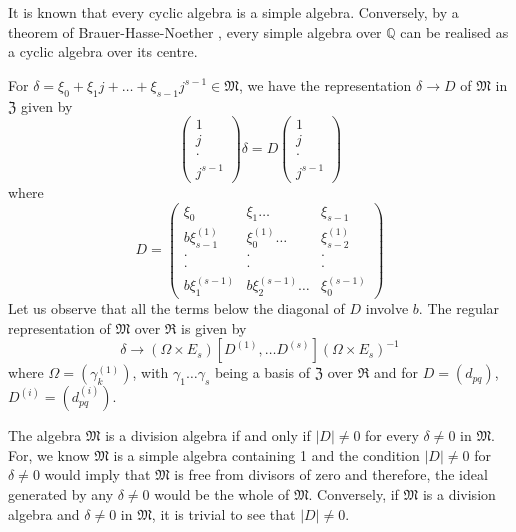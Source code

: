 It is known that every cyclic algebra is a simple algebra. Conversely,
by a theorem of Brauer-Hasse-Noether \cite{7}, every simple algebra
over $\mathbb{Q}$ can be realised as a cyclic algebra over its centre.

For $\delta = \xi_0+\xi_1 j + \ldots + \xi_{s-1} j^{s-1}
\in\mathfrak{M}$, we have the representation $\delta \rightarrow D$ of
$\mathfrak{M}$ in $\mathfrak{Z}$ given by 
$$
\left(\begin{smallmatrix}1 \\ j \\\cdot
  \\ j^{s-1}\end{smallmatrix}\right) \delta = D
\left(\begin{smallmatrix} 1 \\ j \\ \cdot
  \\ j^{s-1}\end{smallmatrix}\right) 
$$
where
\begin{equation*}
D = \left(\begin{smallmatrix}\xi_0 & \xi_1 \ldots & \xi_{s-1}\\
b\xi^{(1)}_{s-1} & \xi^{(1)}_{0} \ldots & \xi^{(1)}_{s-2}\\
\cdotp & \cdotp &\cdotp  \\
\cdotp &\cdotp &\cdotp  \\
b\xi^{(s-1)}_1 & b\xi^{(s-1)}_2 \ldots & \xi^{(s-1)}_0 
\end{smallmatrix}\right) \tag{35}\label{eq35}
\end{equation*}\pageoriginale
Let us observe that all the terms below the diagonal of $D$ involve
$b$. The regular representation of $\mathfrak{M}$ over $\mathfrak{R}$
is given by
$$
\delta \rightarrow (\Omega \times E_s) [D^{(1)}, \ldots D^{(s)}]
(\Omega \times E_s)^{-1}
$$
where $\Omega = (\gamma^{(1)}_k)$, with $\gamma_1 \ldots \gamma_s$
being a basis of $\mathfrak{Z}$ over $\mathfrak{R}$ and for
$D=(d_{pq})$, $D^{(i)}= (d^{(i)}_{pq})$.

The algebra $\mathfrak{M}$ is a division algebra if and only if
$|D|\neq 0$ for every $\delta \neq 0$ in $\mathfrak{M}$. For, we know
$\mathfrak{M}$ is a simple algebra containing 1 and the condition
$|D|\neq 0$ for $\delta \neq 0$ would imply that $\mathfrak{M}$ is
free from divisors of zero and therefore, the ideal generated by any
$\delta \neq 0$ would be the whole of $\mathfrak{M}$. Conversely, if
$\mathfrak{M}$ is a division algebra and $\delta \neq 0$ in
$\mathfrak{M}$, it is trivial to see that $|D|\neq 0$.

